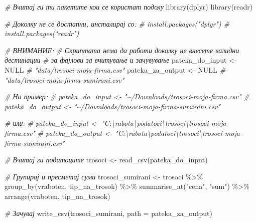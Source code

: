 \documentclass[
]{book}
\newenvironment{Shaded}{\begin{snugshade}}{\end{snugshade}}
\newcommand{\AttributeTok}[1]{\textcolor[rgb]{0.77,0.63,0.00}{#1}}
\newcommand{\CommentTok}[1]{\textcolor[rgb]{0.56,0.35,0.01}{\textit{#1}}}
\newcommand{\ConstantTok}[1]{\textcolor[rgb]{0.00,0.00,0.00}{#1}}
\newcommand{\FunctionTok}[1]{\textcolor[rgb]{0.00,0.00,0.00}{#1}}
\newcommand{\NormalTok}[1]{#1}
\newcommand{\OtherTok}[1]{\textcolor[rgb]{0.56,0.35,0.01}{#1}}
\newcommand{\SpecialCharTok}[1]{\textcolor[rgb]{0.00,0.00,0.00}{#1}}
\newcommand{\StringTok}[1]{\textcolor[rgb]{0.31,0.60,0.02}{#1}}
\begin{document}
\begin{Shaded}
\begin{Highlighting}[]
\CommentTok{\# Вчитај ги ти пакетите кои се користат подолу }
\FunctionTok{library}\NormalTok{(dplyr)}
\FunctionTok{library}\NormalTok{(readr)}

\CommentTok{\# Доколку не се достапни, инсталирај со:}
\CommentTok{\# install.packages("dplyr")}
\CommentTok{\# install.packages("readr")}

\CommentTok{\# ВНИМАНИЕ:}
\CommentTok{\# Скриптата нема да работи доколку не внесете валидни дестинации}
\CommentTok{\# за фајлови за вчитување и зачувување}
\NormalTok{pateka\_do\_input }\OtherTok{\textless{}{-}} \ConstantTok{NULL} \CommentTok{\# "data/trosoci{-}moja{-}firma.csv"}
\NormalTok{pateka\_za\_output }\OtherTok{\textless{}{-}} \ConstantTok{NULL} \CommentTok{\# "data/trosoci{-}moja{-}firma{-}sumirani.csv"}

\CommentTok{\# На пример:}
\CommentTok{\# pateka\_do\_input \textless{}{-} "\textasciitilde{}/Downloads/trosoci{-}moja{-}firma.csv" }
\CommentTok{\# pateka\_do\_output \textless{}{-} "\textasciitilde{}/Downloads/trosoci{-}moja{-}firma{-}sumirani.csv" }

\CommentTok{\# или:}
\CommentTok{\# pateka\_do\_input \textless{}{-} "C:\textbackslash{}rabota\textbackslash{}podatoci\textbackslash{}trosoci\textbackslash{}trosoci{-}moja{-}firma.csv"}
\CommentTok{\# pateka\_do\_output \textless{}{-} "C:\textbackslash{}rabota\textbackslash{}podatoci\textbackslash{}trosoci\textbackslash{}trosoci{-}moja{-}firma{-}sumirani.csv"}

\CommentTok{\# Вчитај ги податоците}
\NormalTok{trosoci }\OtherTok{\textless{}{-}} \FunctionTok{read\_csv}\NormalTok{(pateka\_do\_input)}

\CommentTok{\# Групирај и пресметај суми}
\NormalTok{trosoci\_sumirani }\OtherTok{\textless{}{-}}\NormalTok{ trosoci }\SpecialCharTok{\%\textgreater{}\%} 
  \FunctionTok{group\_by}\NormalTok{(vraboten, tip\_na\_trosok) }\SpecialCharTok{\%\textgreater{}\%} 
  \FunctionTok{summarise\_at}\NormalTok{(}\StringTok{"cena"}\NormalTok{, }\StringTok{"sum"}\NormalTok{) }\SpecialCharTok{\%\textgreater{}\%} 
  \FunctionTok{arrange}\NormalTok{(vraboten, tip\_na\_trosok)}

\CommentTok{\# Зачувај}
\FunctionTok{write\_csv}\NormalTok{(trosoci\_sumirani, }
          \AttributeTok{path =}\NormalTok{ pateka\_za\_output)}
\end{Highlighting}
\end{Shaded}
\end{document}

